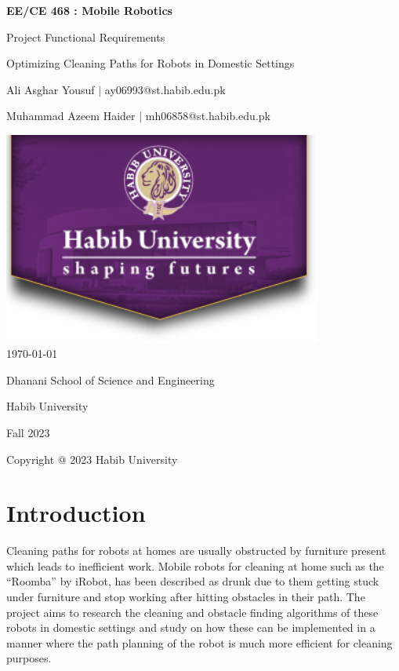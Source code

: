 \documentclass[12pt]{article}
\begin{document}
\begin{titlepage}
    \centering
    {\LARGE\textbf{EE/CE 468 : Mobile Robotics}\par}
    \vspace{0.5cm}
    {\Large Project Functional Requirements\par}
    \vspace{0.2cm}
    {\Large Optimizing Cleaning Paths for Robots in Domestic Settings\par}
    \vspace*{\fill} %
    {\large Ali Asghar Yousuf $\mid$ ay06993@st.habib.edu.pk\par}
    {\large Muhammad Azeem Haider $\mid$ mh06858@st.habib.edu.pk\par}
    \vspace{2cm}
    \includegraphics[height=7cm]{../HU_logo}\\\bigskip
    {\large \today}\\\bigskip\bigskip
    \vspace{1cm}
    \vspace{2cm}
    {\large Dhanani School of Science and Engineering\par}
    {\large Habib University\par}
    {\large Fall 2023\par}
    \vspace*{\fill} %
    {\large Copyright @ 2023 Habib University\par}
\end{titlepage}

\thispagestyle{empty} %
\tableofcontents
\clearpage

\section{Introduction}
Cleaning paths for robots at homes are usually obstructed by furniture present
which leads to inefficient work. Mobile robots for cleaning at home such as the
``Roomba'' by iRobot, has been described as drunk due to them getting stuck
under furniture and stop working after hitting obstacles in their path. The
project aims to research the cleaning and obstacle finding algorithms of these
robots in domestic settings and study on how these can be implemented in a
manner where the path planning of the robot is much more efficient for cleaning
purposes.
\end{document}

